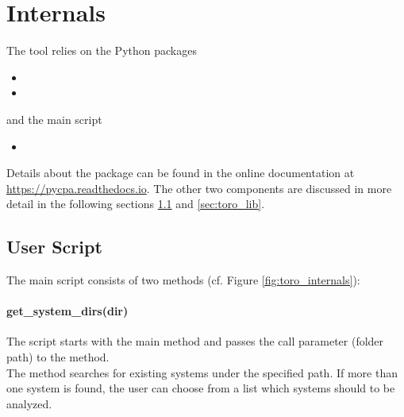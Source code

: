 \section{Internals}

The tool \Tool relies on the Python packages
\begin{itemize}[itemsep=0pt]
	\item {}
	\item {}
\end{itemize}
and the main script
\begin{itemize}[itemsep=0pt]
	\item {}
\end{itemize}
Details about the  package can be found in the online documentation at \url{https://pycpa.readthedocs.io}.
The other two components are discussed in more detail in the following sections \ref{sec:script} and \ref{sec:toro_lib}.
    
\subsection{User Script}
\label{sec:script}
The main script  consists of two methods (cf. Figure \ref{fig:toro_internals}):

\paragraph{get\_system\_dirs(dir)}
The script  starts with the main method and passes the call parameter (folder path) to the  method. \\
The method  searches for existing systems under the specified path. 
If more than one system is found, the user can choose from a list which systems should to be analyzed. 

